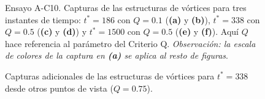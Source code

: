 \begin{figure}[H]
  \caption{Ensayo A-C10. Capturas de las estructuras de vórtices para tres instantes de tiempo: $t^* =186$ con $Q=0\text{.}1$ (\textbf{(a)} y \textbf{(b)}), $t^* =338$ con $Q=0\text{.}5$ (\textbf{(c)} y \textbf{(d)}) y $t^* = 1500$ con $Q=0\text{.}5$ (\textbf{(e)} y \textbf{(f)}). Aquí $Q$ hace referencia al parámetro del Criterio Q. \textit{Observación: la escala de colores de la captura en \textbf{(a)} se aplica al resto de figuras}.}
  \label{fig:mosaico2-ac10}
\end{figure}

\newpage

\begin{figure}[H]
  \centering  
  \caption{Capturas adicionales de las estructuras de vórtices para $t^* =338$ desde otros puntos de vista ($Q=0\text{.}75$).}
  \label{fig:mosaico-ac10-v1-v2}
\end{figure}



